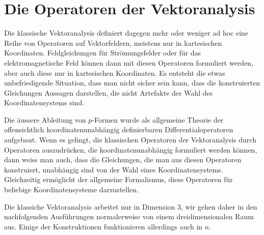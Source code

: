 %
%
%
\section{Die Operatoren der Vektoranalysis
\label{buch:hodge:section:vektoranalysis}}
Die klassische Vektoranalysis definiert dagegen mehr oder weniger
ad hoc eine Reihe von Operatoren auf Vektorfeldern, meistens nur
in kartesischen Koordinaten.
Feldgleichungen für Strömungsfelder oder für das elektromagnetische
Feld können dann mit diesen Operatoren formuliert werden, aber auch
diese nur in kartesischen Koordinaten.
Es entsteht die etwas unbefriedigende Situation, dass man nicht
sicher sein kann, dass die konstruierten Gleichungen Aussagen
darstellen, die nicht Artefakte der Wahl des Koordinatensystems
sind.

Die äussere Ableitung von $p$-Formen wurde als allgemeine Theorie
der offensichtlich koordinatenunabhängig definierbaren
Differentialoperatoren aufgebaut.
Wenn es gelingt, die klassischen Operatoren der Vektoranalysis
durch Operatoren auszudrücken, die koordinatenunabhängig formuliert
werden können, dann weiss man auch, dass die Gleichungen, die man
aus diesen Operatoren konstruiert, unabhängig sind von der Wahl
eines Koordinatensystems.
Gleichzeitig ermöglicht der allgemeine Formalismus, diese Operatoren
für beliebige Koordinatensysteme darzustellen.

Die klassiche Vektoranalysis arbeitet nur in Dimension 3, wir gehen
daher in den nachfolgenden Ausführungen normalerweise von einem
dreidimensionalen Raum aus.
Einige der Konstruktionen funktionieren allerdings auch in $n$.

%
%
